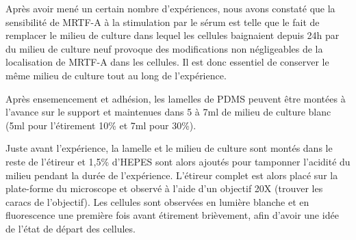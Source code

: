 \documentclass{report}
\begin{document}
	Après avoir mené un certain nombre d'expériences, nous avons constaté que la sensibilité de MRTF-A à la stimulation par le sérum est telle que le fait de remplacer le milieu de culture dans lequel les cellules baignaient depuis 24h par du milieu de culture neuf provoque des modifications non négligeables de la localisation de MRTF-A dans les cellules. Il est donc essentiel de conserver le même milieu de culture tout au long de l'expérience. 
	
	Après ensemencement et adhésion, les lamelles de PDMS peuvent être montées à l'avance sur le support et maintenues dans 5 à 7ml de milieu de culture blanc (5ml pour l'étirement 10\% et 7ml pour 30\%). 
	
	Juste avant l'expérience, la lamelle et le milieu de culture sont montés dans le reste de l'étireur et 1,5\% d'HEPES sont alors ajoutés pour tamponner l'acidité du milieu pendant la durée de l'expérience. L'étireur complet est alors placé sur la plate-forme du microscope et observé à l'aide d'un objectif 20X (trouver les caracs de l'objectif). Les cellules sont observées en lumière blanche et en fluorescence une première fois avant étirement brièvement, afin d'avoir une idée de l'état de départ des cellules. 
	
\end{document}
